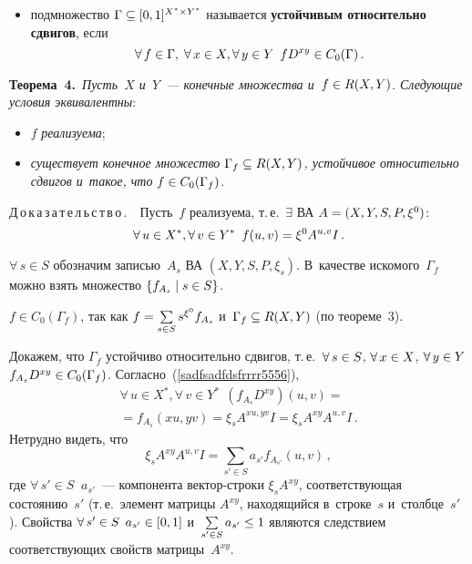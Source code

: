 \begin{multicols}{2}
\begin{itemize}
\item подмножество
$\Gamma\hm\subseteq [0,1]^{X^*\times Y^*}$
называется \textbf{устойчивым относительно сдвигов},
если
$$
\forall\,f\in \Gamma,\;
\forall\,x\in X, \forall\,y\in Y\enskip fD^{xy}\in C_0(\Gamma)\,.
$$
\end{itemize}


\noindent
\textbf{Теорема~4.}\
\textit{Пусть~$X$ и~$Y$~--- конечные множества
и~$f\hm\in R(X,Y)$. Следующие условия эквивалентны}:
\begin{itemize}
\item $f$ \textit{реализуема};
\item \textit{существует конечное  множество $\Gamma_f\hm\subseteq
R(X,Y)$, устойчивое относительно сдвигов и~такое, что} $f\hm\in C_0(\Gamma_f)$.
\end{itemize}

\noindent
Д\,о\,к\,а\,з\,а\,т\,е\,л\,ь\,с\,т\,в\,о\,.\ \
Пусть~$f$ реализуема, т.\,е.\ $\exists$ ВА $A\hm=(X,Y,S,P, \xi^0)$:
$$
\forall\,u\in X^*, \forall\,v\in Y^*\enskip f(u,v)=\xi^0A^{u,v}I\,.
$$

$\forall\,s\in S$ обозначим записью~$A_s$
ВА $(X,Y,S,P, \xi_s)$.
В~качестве искомого~$\Gamma_f$ можно взять множество
$\{f_{A_s}\mid s\hm\in S\}$.

$f\in C_0(\Gamma_f)$, так как $f\hm=\sum\limits_{s\in S}s^{\xi^0}
f_{A_{s}}$ и~$\Gamma_f\hm\subseteq R(X,Y)$ (по теореме~3).


Докажем, что $\Gamma_f$ устойчиво относительно сдвигов, т.\,е.\
$\forall\,s\hm\in S$, $\forall\,x\hm\in X$, $\forall\,y\hm\in Y$
$f_{A_s}D^{xy}\hm\in C_0(\Gamma_f)$. Согласно~(\ref{sadfsadfdsfrrrr5556}),
\begin{multline*}
\forall\,u\in X^*, \forall\,v \in Y^*\ \ 
(f_{A_s}D^{xy})(u,v)={}\\
{}= f_{A_s}(xu,yv)=\xi_sA^{xu,yv}I=
\xi_sA^{xy}A^{u,v}I\,.
\end{multline*}
Нетрудно видеть, что
$$
\xi_sA^{xy}A^{u,v}I= \sum\limits_{s'\in S}a_{s'}
f_{A_{s'}}(u,v)\,,
$$
где $\forall\,s'\in S\;\; a_{s'}$~--- компонента
век\-тор-стро\-ки $\xi_sA^{xy}$, соответствующая состоянию~$s'$ (т.\,е.\
элемент матрицы $A^{xy}$, находящийся в~строке~$s$ и~столбце~$s'$).
Свойства $\forall\,s'\hm\in S$ $a_{s'}\hm\in [0,1]$ и~$\sum\limits_{s'\in S}a_{s'}\hm\leq 1$ являются следствием
соответствующих свойств матрицы~$A^{xy}$.


\end{multicols}

